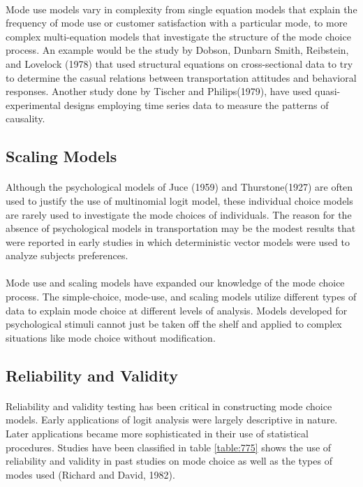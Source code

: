 \paragraph{}Mode use models vary in complexity from single equation models that explain the frequency of mode use or customer satisfaction with a particular mode, to more complex multi-equation models that investigate the structure of the mode choice process. An example would be the study by Dobson, Dunbarn Smith, Reibstein, and Lovelock (1978) that used structural equations on cross-sectional data to try to determine the casual relations between transportation attitudes and behavioral responses. Another study done by Tischer and Philips(1979), have used quasi-experimental designs employing time series data to measure the patterns of causality.

\subsection{Scaling Models}
\paragraph{}Although the psychological models of Juce (1959) and Thurstone(1927) are often used to justify the use of multinomial logit model, these individual choice models are rarely used to investigate the mode choices of individuals.  The reason for the absence of psychological models in transportation may be the modest results that were reported in early studies in which deterministic vector models were used to analyze subjects preferences.
\paragraph{}Mode use and scaling models have expanded our knowledge of the mode choice process. The simple-choice, mode-use, and scaling models utilize different types of data to explain mode choice at different levels of analysis. Models developed for psychological stimuli cannot just be taken off the shelf and applied to complex situations like mode choice without modification.

\subsection{Reliability and Validity}
\paragraph{}Reliability and validity testing has been critical in constructing mode choice models. Early applications of logit analysis were largely descriptive in nature. Later applications became more sophisticated in their use of statistical procedures. Studies have been classified in table \ref{table:775} shows the use of reliability and validity in past studies on mode choice as well as the types of modes used (Richard and David, 1982).
 
